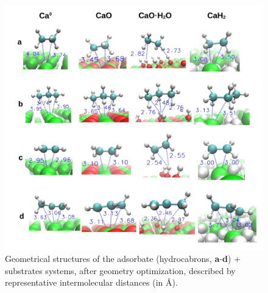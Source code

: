 \documentclass[journal=jpccck,manuscript=article]{achemso}
\begin{document}
\begin{figure}[!b]
	\centering
	\includegraphics[width=\linewidth]{Figure8}
	\caption{Geometrical structures of the adsorbate (hydrocabrons, \textbf{a}-\textbf{d}) + substrates systems, after geometry optimization, described by representative intermolecular distances (in \si{\angstrom}).}
	\label{fig:distsad}
\end{figure}
\end{document}
